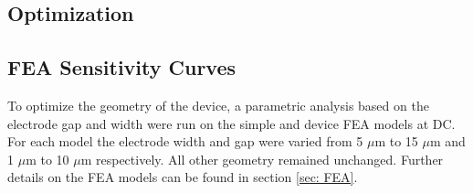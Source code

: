 \clearpage

\subsection{Optimization}
\label{sec:optimization_results}

\subsection*{FEA Sensitivity Curves}

\par To optimize the geometry of the device, a parametric analysis based on the electrode gap and width were run on the simple and device FEA models at DC. For each model the electrode width and gap were varied from 5 $\mu$m to 15 $\mu$m and 1 $\mu$m to 10 $\mu$m respectively. All other geometry remained unchanged. Further details on the FEA models can be found in section \ref{sec: FEA}.

